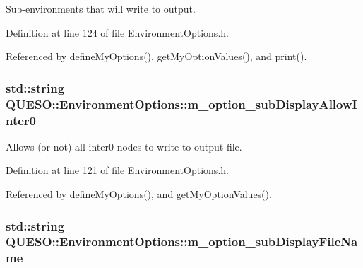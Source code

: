 Sub-\/environments that will write to output. 



Definition at line 124 of file Environment\-Options.\-h.



Referenced by define\-My\-Options(), get\-My\-Option\-Values(), and print().

\hypertarget{class_q_u_e_s_o_1_1_environment_options_acf680dfdb7d9d91d0154a65d973359a8}{
\subsubsection[{m\-\_\-option\-\_\-sub\-Display\-Allow\-Inter0}]{\setlength{\rightskip}{0pt plus 5cm}std\-::string Q\-U\-E\-S\-O\-::\-Environment\-Options\-::m\-\_\-option\-\_\-sub\-Display\-Allow\-Inter0\hspace{0.3cm}{\ttfamily [private]}}}\label{class_q_u_e_s_o_1_1_environment_options_acf680dfdb7d9d91d0154a65d973359a8}


Allows (or not) all inter0 nodes to write to output file. 



Definition at line 121 of file Environment\-Options.\-h.



Referenced by define\-My\-Options(), and get\-My\-Option\-Values().

\hypertarget{class_q_u_e_s_o_1_1_environment_options_a500c18cec1f5a1f5d89fec2705ef9106}{
\subsubsection[{m\-\_\-option\-\_\-sub\-Display\-File\-Name}]{\setlength{\rightskip}{0pt plus 5cm}std\-::string Q\-U\-E\-S\-O\-::\-Environment\-Options\-::m\-\_\-option\-\_\-sub\-Display\-File\-Name\hspace{0.3cm}{\ttfamily [private]}}}\label{class_q_u_e_s_o_1_1_environment_options_a500c18cec1f5a1f5d89fec2705ef9106}


